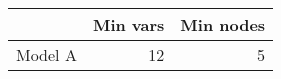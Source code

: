 
\begin{tabular}{l|r|r}
\hline
  & Min vars & Min nodes\\
\hline
Model A & 12 & 5\\
\hline
\end{tabular}